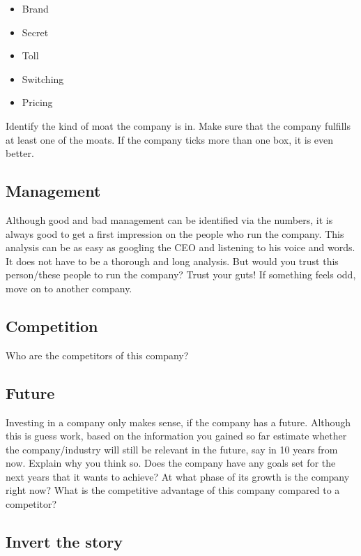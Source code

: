 \begin{itemize}
    \item Brand
    \item Secret
    \item Toll
    \item Switching
    \item Pricing
\end{itemize}

Identify the kind of moat the company is in. Make sure that the company fulfills
at least one of the moats. If the company ticks more than one box, it is even
better.

\subsection{Management}

Although good and bad management can be identified via the numbers, it is always
good to get a first impression on the people who run the company. This analysis can be
as easy as googling the CEO and listening to his voice and words. It does not have to be
a thorough and long analysis. But would you trust this person/these people to run the
company? Trust your guts! If something feels odd, move on to another company.

\subsection{Competition}

Who are the competitors of this company?

\subsection{Future}

Investing in a company only makes sense, if the company has a future. Although
this is guess work, based on the information you gained so far estimate whether the
company/industry will still be relevant in the future, say in 10 years from now. Explain
why you think so. Does the company have any goals set for the next years that it
wants to achieve? At what phase of its growth is the company right now? What is the
competitive advantage of this company compared to a competitor?

\subsection{Invert the story}

